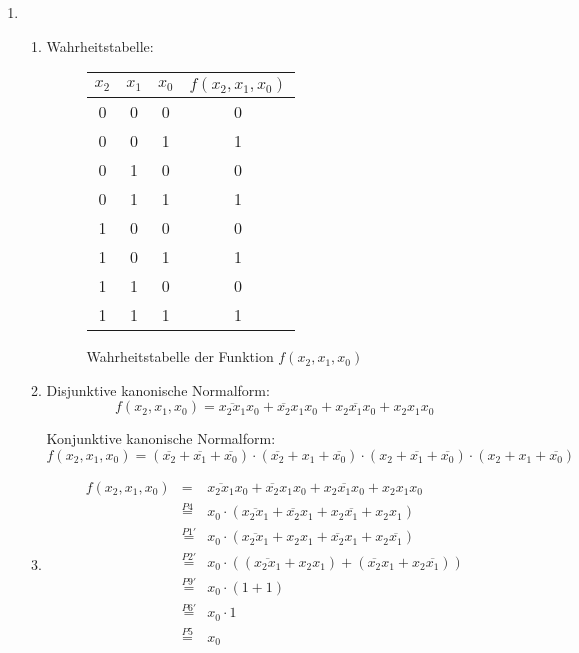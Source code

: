 \documentclass[a4paper]{article}
\begin{document}
\begin{enumerate}[label=\alph*)]
	\item 
	\begin{enumerate}[label=\roman*)]
		\item Wahrheitstabelle:
		\begin{figure}[h!]
			\centering
			\begin{tabular}{|c|c|c|c|}
				\hline
				$x_2$ & $x_1$ & $x_0$ & $f(x_2, x_1, x_0)$ \\
				\hline
				0 & 0 & 0 & 0 \\
				0 & 0 & 1 & 1 \\
				0 & 1 & 0 & 0 \\
				0 & 1 & 1 & 1 \\
				1 & 0 & 0 & 0 \\
				1 & 0 & 1 & 1 \\
				1 & 1 & 0 & 0 \\
				1 & 1 & 1 & 1 \\
				\hline
			\end{tabular}
		\caption{Wahrheitstabelle der Funktion $f(x_2, x_1, x_0)$}
		\end{figure}
	
		\item 
		Disjunktive kanonische Normalform:\\ 
		\begin{equation}
			f(x_2, x_1, x_0) = \overline{x_2x_1}x_0 + \overline{x_2}x_1x_0 + x_2\overline{x_1}x_0 + x_2x_1x_0
		\end{equation}
		
		Konjunktive kanonische Normalform: \\
		\begin{equation}
			f(x_2, x_1, x_0) = (\overline{x_2} + \overline{x_1} + \overline{x_0}) \cdot (\overline{x_2} + x_1 + \overline{x_0}) \cdot (x_2 + \overline{x_1} + \overline{x_0}) \cdot (x_2 + x_1 + \overline{x_0})
		\end{equation}
		
		\item 
		\begin{equation}
		\begin{aligned}
			f(x_2, x_1, x_0) &= & \overline{x_2x_1}x_0 + \overline{x_2}x_1x_0 + x_2\overline{x_1}x_0 + x_2x_1x_0 \\
			&\stackrel{P4}{=} & x_0 \cdot (\overline{x_2x_1} + \overline{x_2}x_1 + x_2\overline{x_1} + x_2x_1) \\
			&\stackrel{P1'}{=} & x_0 \cdot (\overline{x_2x_1} + x_2x_1 + \overline{x_2}x_1 + x_2\overline{x_1}) \\
			&\stackrel{P2'}{=} & x_0 \cdot ((\overline{x_2x_1} + x_2x_1) + ( \overline{x_2}x_1 + x_2\overline{x_1})) \\
			&\stackrel{P9'}{=} & x_0 \cdot (1 + 1) \\
			&\stackrel{P6'}{=} & x_0 \cdot 1 \\
			&\stackrel{P5}{=} & x_0 \\
		\end{aligned}
		\end{equation}
	\end{enumerate}
\end{enumerate}
\clearpage
\end{document}
